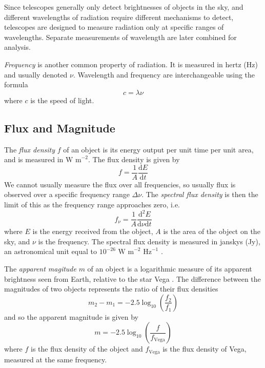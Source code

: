             Since telescopes generally only detect brightnesses of objects in
            the sky, and different wavelengths of radiation require different
            mechanisms to detect, telescopes are designed to measure radiation
            only at specific ranges of wavelengths. Separate measurements of
            wavelength are later combined for analysis.

            \emph{Frequency} is another common property of radiation. It is
            measured in hertz (Hz) and usually denoted $\nu$. Wavelength and
            frequency are interchangeable using the formula
            \[
                c = \lambda \nu
            \]
            where $c$ is the speed of light.

        \subsection{Flux and Magnitude}

            The \emph{flux density} $f$ of an object is its energy output per
            unit time per unit area, and is measured in $\text{W m}^{-2}$. The
            flux density is given by
            \[
                f = \frac{1}{A}\frac{\text{d}E}{\text{d}t}
            \]
            We cannot usually measure the flux over all frequencies, so usually
            flux is observed over a specific frequency range $\Delta \nu$. The
            \emph{spectral flux density} is then the limit of this as the
            frequency range approaches zero, i.e.
            \[
                f_\nu = \frac{1}{A}\frac{\text{d}^2E}{\text{d}\nu\text{d}t}
            \]
            where $E$ is the energy received from the object, $A$ is the area of
            the object on the sky, and $\nu$ is the frequency. The spectral flux
            density is measured in janskys (Jy), an astronomical unit equal to
            $10^{-26} \text{ W m}^{-2} \text{ Hz}^{-1}$ \citep{francis08}.

            The \emph{apparent magitude} $m$ of an object is a logarithmic
            measure of its apparent brightness seen from Earth, relative to the
            star Vega \citep{francis08}. The difference between the magnitudes
            of two objects represents the ratio of their flux densities
            \begin{equation}
                \label{eq:magnitude-difference}
                m_2 - m_1 = -2.5 \log_{10} \left(\frac{f_2}{f_1}\right)
            \end{equation}
            and so the apparent magnitude is given by
            \begin{equation}
                \label{eq:apparent-magnitude}
                m = -2.5 \log_{10} \left(\frac{f}{f_{\text{Vega}}}\right)
            \end{equation}
            where $f$ is the flux density of the object and $f_{\text{Vega}}$ is
            the flux density of Vega, measured at the same frequency.

